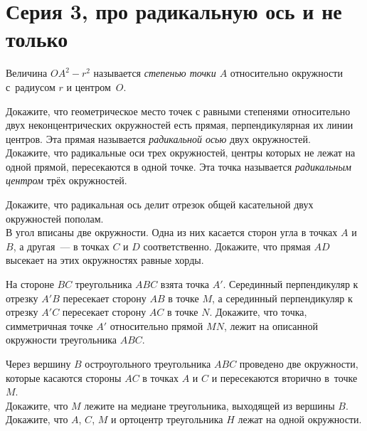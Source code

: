

\section*{Серия 3, про радикальную ось и не только}


Величина $OA^2 - r^2$ называется \emph{степенью точки $A$} относительно
окружности с~радиусом $r$ и центром~$O$.

\begin{problems}

\item
\sbp
Докажите, что геометрическое место точек с равными степенями относительно двух
неконцентрических окружностей есть прямая, перпендикулярная их линии центров.
Эта прямая называется \emph{радикальной осью} двух окружностей.
\\
\sbp
Докажите, что радикальные оси трех окружностей, центры которых не лежат на
одной прямой, пересекаются в одной точке.
Эта точка называется \emph{радикальным центром} трёх окружностей.

\item
\sbp
Докажите, что радикальная ось делит отрезок общей касательной двух окружностей
пополам.
\\
\sbp
В угол вписаны две окружности.
Одна из них касается сторон угла в точках $A$ и $B$, а другая~--- в точках $C$
и $D$ соответственно.
Докажите, что прямая $AD$ высекает на этих окружностях равные хорды.

\item
На стороне $BC$ треугольника $ABC$ взята точка $A'$.
Серединный перпендикуляр к отрезку $A'B$ пересекает сторону $AB$ в точке $M$,
а серединный перпендикуляр к отрезку $A'C$ пересекает сторону $AC$ в точке $N$.
Докажите, что точка, симметричная точке $A'$ относительно прямой $MN$, лежит на
описанной окружности треугольника $ABC$.

\item
Через вершину $B$ остроугольного треугольника $ABC$ проведено две окружности,
которые касаются стороны $AC$ в точках $A$ и $C$ и пересекаются вторично
в~точке~$M$.
\\
\sbp
Докажите, что $M$ лежите на медиане треугольника, выходящей из вершины $B$.
\\
\sbp
Докажите, что $A$, $C$, $M$ и ортоцентр треугольника $H$ лежат на одной
окружности.


\end{problems}
